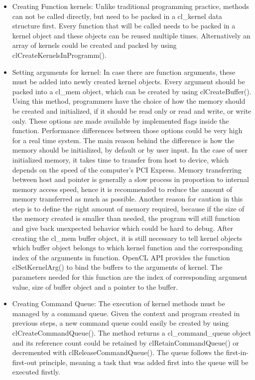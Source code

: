 \begin{itemize}
	\item Creating Function kernels: Unlike traditional programming practice, methods can not be called directly, but need to be packed in a cl\_kernel data structure first. Every function that will be called needs to be packed in a kernel object and these objects can be reused multiple times. Alternatively an array of kernels could be created and packed by using clCreateKernelsInProgramm(). 
	\item Setting arguments for kernel:  In case there are function arguments, these must be added into newly created kernel objects. Every argument should be packed into a cl\_mem object, which can be created by using clCreateBuffer(). Using this method, programmers have the choice of how the memory should be created and initialized, if it should be read only or read and write, or write only. These options are made available by implemented flags inside the function. Performance differences between those options could be very high for a real time system. The main reason behind the difference is how the memory should be initialized, by default or by user input. In the case of user initialized memory, it takes time to transfer from host to device, which depends on the speed of the computer’s PCI Express. Memory transferring between host and pointer is generally a slow process in proportion to internal memory access speed, hence it is recommended to reduce the amount of memory transferred as much as possible. Another reason for caution in this step is to define the right amount of memory required, because if the size of the memory created is smaller than needed, the program will still function and give back unexpected behavior which could be hard to debug. After creating the cl\_mem buffer object, it is still necessary to tell kernel objects which buffer object belongs to which kernel function and the corresponding index of the arguments in function. OpenCL API provides the function clSetKernelArg() to bind the buffers to the arguments of kernel. The parameters needed for this function are the index of corresponding argument value, size of buffer object and a pointer to the buffer.
	\item Creating Command Queue: The execution of kernel methods must be managed by a command queue. Given the context and program created in previous steps, a new command queue could easily be created by using clCreateCommandQueue(). The method returns a cl\_command\_queue object and its reference count could be retained by clRetainCommandQueue() or decremented with clReleaseCommandQueue(). The queue follows the first-in-first-out principle, meaning a task that was added first into the queue will be executed firstly.

\end{itemize}
